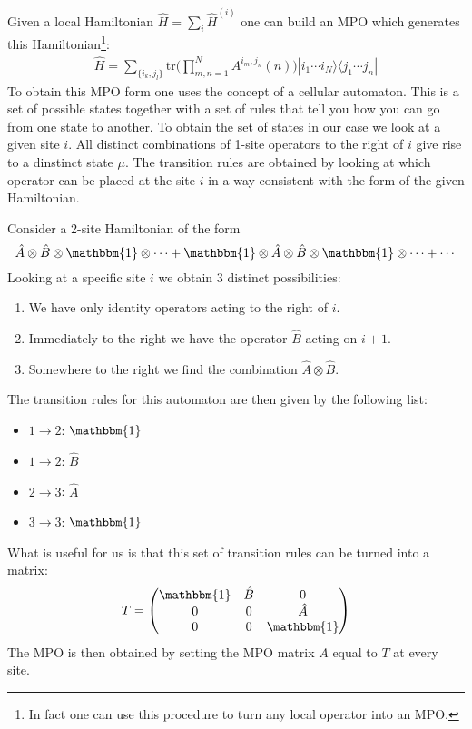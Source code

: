 	\begin{method}
		Given a local Hamiltonian $\hat{H}=\sum_i\hat{H}^{(i)}$ one can build an MPO which generates this Hamiltonian\footnote{In fact one can use this procedure to turn any local operator into an MPO.}:
		\begin{gather}
			\hat{H} = \sum_{\{i_k,j_l\}}\text{tr}\Big(\prod_{m,n=1}^NA^{i_m,j_n}(n)\Big)|i_1\cdots i_N\rangle\langle j_1\cdots j_n|
		 \end{gather}
		 To obtain this MPO form one uses the concept of a cellular automaton. This is a set of possible states together with a set of rules that tell you how you can go from one state to another. To obtain the set of states in our case we look at a given site $i$. All distinct combinations of 1-site operators to the right of $i$ give rise to a dinstinct state $\mu$. The transition rules are obtained by looking at which operator can be placed at the site $i$ in a way consistent with the form of the given Hamiltonian.
	\end{method}
	\begin{example}
		Consider a 2-site Hamiltonian of the form \[\hat{A}\otimes\hat{B}\otimes\mathbbm{1}\otimes\cdots+\mathbbm{1}\otimes\hat{A}\otimes\hat{B}\otimes\mathbbm{1}\otimes\cdots+\cdots\] Looking at a specific site $i$ we obtain 3 distinct possibilities:
		\begin{enumerate}
			\item We have only identity operators acting to the right of $i$.
			\item Immediately to the right we have the operator $\hat{B}$ acting on $i+1$.
			\item Somewhere to the right we find the combination $\hat{A}\otimes\hat{B}$.
		 \end{enumerate}
		 The transition rules for this automaton are then given by the following list:
		 \begin{itemize}
		 	\item $1\rightarrow2$: $\mathbbm{1}$
		 	\item $1\rightarrow2$: $\hat{B}$
		 	\item $2\rightarrow3$: $\hat{A}$
		 	\item $3\rightarrow3$: $\mathbbm{1}$
		 \end{itemize}
		 What is useful for us is that this set of transition rules can be turned into a matrix: \[T=\begin{pmatrix}\mathbbm{1}&\hat{B}&0\\0&0&\hat{A}\\0&0&\mathbbm{1}\end{pmatrix}\] The MPO is then obtained by setting the MPO matrix $A$ equal to $T$ at every site.
	\end{example}
	
